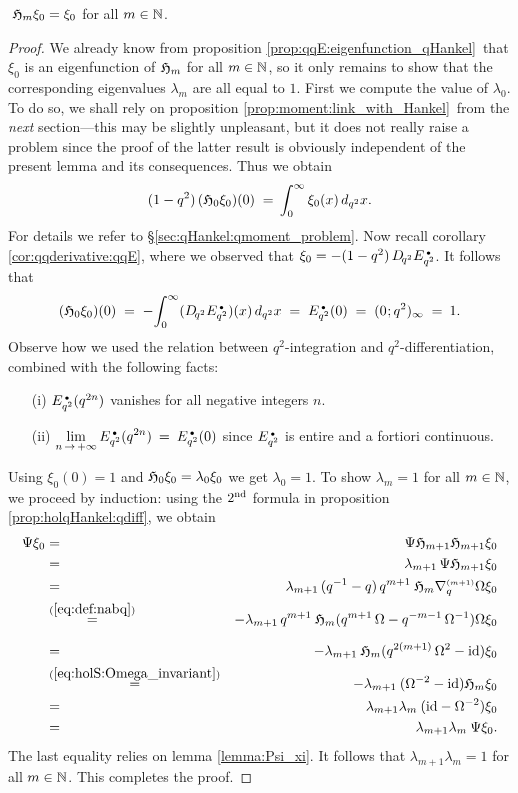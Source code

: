 \begin{lemma} \label{lemma:xizero:eigenfunction:Hol_m}
$\; \mathfrak{H}_{m} \xi_0 = \xi_0$ for all\/ $m \in \mathbb{N}$.
\end{lemma}

\begin{proof}
We already know from proposition \ref{prop:qqE:eigenfunction_qHankel}\ that
$\xi_0$ is an eigenfunction of $\mathfrak{H}_{m}$ for all $m \in \mathbb{N}$, so it only remains
to show that the corresponding eigenvalues $\lambda_m$ are all equal to $1$.
First we compute the value of $\lambda_0$.
To do so, we shall rely on proposition \ref{prop:moment:link_with_Hankel}\
from the {\em next\/} section---this may be slightly unpleasant, but it does not really raise
a problem since the proof of the latter result is obviously independent of the present lemma
and its consequences. Thus we obtain
$$ (1-q^2) \, (\mathfrak{H}_{0}\xi_0)(0)
            \;=\, \int_0^\infty \xi_0(x)\, d_{q^2}x. $$
For details we refer to \S \ref{sec:qHankel:qmoment_problem}\@.
Now recall corollary \ref{cor:qqderivative:qqE}, where we observed that
$\xi_0 = -(1-q^2)\, D_{\!q^2} E_{q^2}^{\scriptscriptstyle \, \bullet}$. It follows that
$$ (\mathfrak{H}_{0}\xi_0)(0)
  \;=\; -\! \int_0^\infty (D_{\!q^2} E_{q^2}^{\scriptscriptstyle \, \bullet})(x)\, d_{q^2}x
  \;=\;  E_{q^2}^{\scriptscriptstyle \, \bullet}(0)
  \;=\; (0\hspace{.5pt} ; q^2)_\infty
  \;=\:  1. $$
Observe how we used the relation between $q^2$-integration and $q^2$-differentiation,
combined with the following facts:
\begin{enumerate}
\item[(i)]
$E_{q^2}^{\scriptscriptstyle \, \bullet}(q^{2n})$ vanishes for all negative integers $n$.
\item[(ii)]
$\displaystyle \lim_{n \, \rightarrow \, +\infty} E_{q^2}^{\scriptscriptstyle \, \bullet}(q^{2n}) \:=\:   E_{q^2}^{\scriptscriptstyle \, \bullet}(0)$
since $E_{q^2}^{\scriptscriptstyle \, \bullet}$ is entire and a fortiori continuous.
\end{enumerate}
Using $\xi_0(0)=1$ and $\mathfrak{H}_{0}\xi_0 = \lambda_0 \xi_0$ we get $\lambda_0 = 1$.
To show $\lambda_m = 1$ for all $m\in \mathbb{N}$, we proceed by induction:
using the $2^{\rm nd}$ formula in proposition \ref{prop:holqHankel:qdiff}, we obtain
\begin{eqnarray*}
\Psi \xi_0
&=&
\Psi \holH{m+1} \holH{m+1} \xi_0
\\&=&
\lambda_{m+1} \, \Psi \holH{m+1} \xi_0
\\&=&
\lambda_{m+1} \, (q^{-1}-q) \,q^{m+1} \: \holH{m} \nabq{m+1} \Omega \xi_0
\\&\stackrel{(\ref{eq:def:nabq})}{=}&
- \lambda_{m+1} \,q^{m+1} \: \holH{m}
       (q^{m+1}\, \Omega  - q^{-m-1}\, \Omega^{-1}) \Omega \xi_0
\\&=\vertXL&
- \lambda_{m+1} \: \holH{m} (q^{2(m+1)}\, \Omega^2 - \id) \xi_0
\\&\stackrel{(\ref{eq:holS:Omega_invariant})}{=}&
- \lambda_{m+1} \: (\Omega^{-2} - \id)  \holH{m} \xi_0
\\&=&
\lambda_{m+1} \lambda_m \: (\id - \Omega^{-2}) \xi_0
\\&=&
\lambda_{m+1} \lambda_m \: \Psi \xi_0.
\end{eqnarray*}
The last equality relies on lemma \ref{lemma:Psi_xi}\@.
It follows that $\lambda_{m+1} \lambda_m = 1$ for all $m\in \mathbb{N}$.
This completes the proof.
\end{proof}



